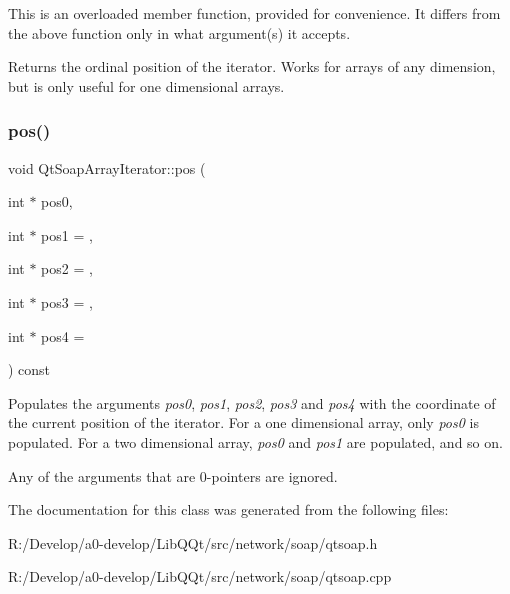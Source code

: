 This is an overloaded member function, provided for convenience. It differs from the above function only in what argument(s) it accepts.

Returns the ordinal position of the iterator. Works for arrays of any dimension, but is only useful for one dimensional arrays. \mbox{\label{class_qt_soap_array_iterator_af6e6e7373d176127dd734cb4c19c5fdb}} 
\subsubsection{\texorpdfstring{pos()}{pos()}\hspace{0.1cm}{\footnotesize\ttfamily [2/2]}}
{\footnotesize\ttfamily void Qt\+Soap\+Array\+Iterator\+::pos (\begin{DoxyParamCaption}\item[{int $\ast$}]{pos0,  }\item[{int $\ast$}]{pos1 = {},  }\item[{int $\ast$}]{pos2 = {},  }\item[{int $\ast$}]{pos3 = {},  }\item[{int $\ast$}]{pos4 = {} }\end{DoxyParamCaption}) const}

Populates the arguments {\itshape pos0}, {\itshape pos1}, {\itshape pos2}, {\itshape pos3} and {\itshape pos4} with the coordinate of the current position of the iterator. For a one dimensional array, only {\itshape pos0} is populated. For a two dimensional array, {\itshape pos0} and {\itshape pos1} are populated, and so on.

Any of the arguments that are 0-\/pointers are ignored. 

The documentation for this class was generated from the following files\+:\begin{DoxyCompactItemize}
\item 
R\+:/\+Develop/a0-\/develop/\+Lib\+Q\+Qt/src/network/soap/qtsoap.\+h\item 
R\+:/\+Develop/a0-\/develop/\+Lib\+Q\+Qt/src/network/soap/qtsoap.\+cpp\end{DoxyCompactItemize}
